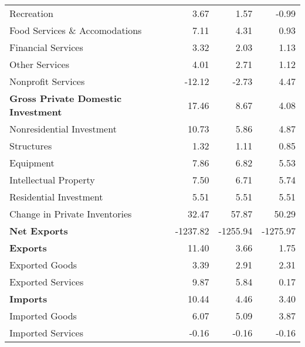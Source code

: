 \documentclass[11pt, letterpaper]{article}\usepackage[]{graphicx}\usepackage[]{color}
\begin{document}
\begin{table}[H]
\begin{tabular}{lrrr}
  \hspace{16mm}  Recreation & 3.67 & 1.57 & -0.99 \\ 
  \hspace{16mm}  Food Services \& Accomodations & 7.11 & 4.31 & 0.93 \\ 
  \hspace{16mm}  Financial Services & 3.32 & 2.03 & 1.13 \\ 
  \hspace{16mm}  Other Services & 4.01 & 2.71 & 1.12 \\ 
  \hspace{16mm}  Nonprofit Services & -12.12 & -2.73 & 4.47 \\ 
  \hspace{0mm} \textbf{Gross Private Domestic Investment} & 17.46 & 8.67 & 4.08 \\ 
  \hspace{8mm}  Nonresidential Investment & 10.73 & 5.86 & 4.87 \\ 
  \hspace{16mm}  Structures & 1.32 & 1.11 & 0.85 \\ 
  \hspace{16mm}  Equipment & 7.86 & 6.82 & 5.53 \\ 
  \hspace{16mm}  Intellectual Property & 7.50 & 6.71 & 5.74 \\ 
  \hspace{8mm}  Residential Investment & 5.51 & 5.51 & 5.51 \\ 
  \hspace{8mm}  Change in Private Inventories & 32.47 & 57.87 & 50.29 \\ 
  \hspace{0mm} \textbf{Net Exports} & -1237.82 & -1255.94 & -1275.97 \\ 
  \hspace{0mm} \textbf{Exports} & 11.40 & 3.66 & 1.75 \\ 
  \hspace{8mm}  Exported Goods & 3.39 & 2.91 & 2.31 \\ 
  \hspace{8mm}  Exported Services & 9.87 & 5.84 & 0.17 \\ 
  \hspace{0mm} \textbf{Imports} & 10.44 & 4.46 & 3.40 \\ 
  \hspace{8mm}  Imported Goods & 6.07 & 5.09 & 3.87 \\ 
  \hspace{8mm}  Imported Services & -0.16 & -0.16 & -0.16 \\ 

\end{tabular}
\end{table}
\end{document}
